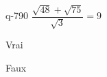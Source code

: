 \begin{truefalse}{q-790}
$\dfrac{\sqrt{48}+\sqrt{75}}{\sqrt{3}}=9$
\item* Vrai
\item Faux
\end{truefalse}

